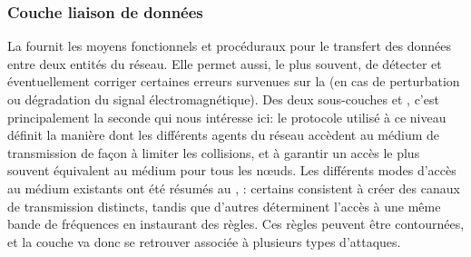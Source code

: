     \subsubsection{Couche liaison de données}
La  fournit les moyens fonctionnels et procéduraux pour le transfert des données entre deux entités du réseau.
Elle permet aussi, le plus souvent, de détecter et éventuellement corriger certaines erreurs survenues sur la  (en cas de perturbation ou dégradation du signal électromagnétique).
Des deux sous-couches \llc et \mac, c'est principalement la seconde qui nous intéresse ici: le protocole utilisé à ce niveau définit la manière dont les différents agents du réseau accèdent au médium de transmission de façon à limiter les collisions, et à garantir un accès le plus souvent équivalent au médium pour tous les nœuds.
Les différents modes d'accès au médium existants ont été résumés au , : certains consistent à créer des canaux de transmission distincts, tandis que d'autres déterminent l'accès à une même bande de fréquences en instaurant des règles.
Ces règles peuvent être contournées, et la couche \mac va donc se retrouver associée à plusieurs types d'attaques.

